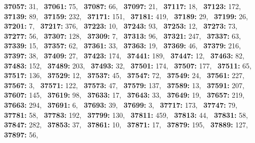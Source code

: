 \textbf{37057:} 31,\allowbreak~ 
\textbf{37061:} 75,\allowbreak~ 
\textbf{37087:} 66,\allowbreak~ 
\textbf{37097:} 21,\allowbreak~ 
\textbf{37117:} 18,\allowbreak~ 
\textbf{37123:} 172,\allowbreak~ 
\textbf{37139:} 89,\allowbreak~ 
\textbf{37159:} 232,\allowbreak~ 
\textbf{37171:} 151,\allowbreak~ 
\textbf{37181:} 419,\allowbreak~ 
\textbf{37189:} 29,\allowbreak~ 
\textbf{37199:} 26,\allowbreak~ 
\textbf{37201:} 7,\allowbreak~ 
\textbf{37217:} 376,\allowbreak~ 
\textbf{37223:} 10,\allowbreak~ 
\textbf{37243:} 93,\allowbreak~ 
\textbf{37253:} 12,\allowbreak~ 
\textbf{37273:} 73,\allowbreak~ 
\textbf{37277:} 56,\allowbreak~ 
\textbf{37307:} 128,\allowbreak~ 
\textbf{37309:} 7,\allowbreak~ 
\textbf{37313:} 96,\allowbreak~ 
\textbf{37321:} 247,\allowbreak~ 
\textbf{37337:} 63,\allowbreak~ 
\textbf{37339:} 15,\allowbreak~ 
\textbf{37357:} 62,\allowbreak~ 
\textbf{37361:} 33,\allowbreak~ 
\textbf{37363:} 19,\allowbreak~ 
\textbf{37369:} 46,\allowbreak~ 
\textbf{37379:} 216,\allowbreak~ 
\textbf{37397:} 38,\allowbreak~ 
\textbf{37409:} 27,\allowbreak~ 
\textbf{37423:} 174,\allowbreak~ 
\textbf{37441:} 189,\allowbreak~ 
\textbf{37447:} 12,\allowbreak~ 
\textbf{37463:} 82,\allowbreak~ 
\textbf{37483:} 152,\allowbreak~ 
\textbf{37489:} 203,\allowbreak~ 
\textbf{37493:} 32,\allowbreak~ 
\textbf{37501:} 174,\allowbreak~ 
\textbf{37507:} 177,\allowbreak~ 
\textbf{37511:} 65,\allowbreak~ 
\textbf{37517:} 136,\allowbreak~ 
\textbf{37529:} 12,\allowbreak~ 
\textbf{37537:} 45,\allowbreak~ 
\textbf{37547:} 72,\allowbreak~ 
\textbf{37549:} 24,\allowbreak~ 
\textbf{37561:} 227,\allowbreak~ 
\textbf{37567:} 3,\allowbreak~ 
\textbf{37571:} 122,\allowbreak~ 
\textbf{37573:} 47,\allowbreak~ 
\textbf{37579:} 137,\allowbreak~ 
\textbf{37589:} 13,\allowbreak~ 
\textbf{37591:} 207,\allowbreak~ 
\textbf{37607:} 145,\allowbreak~ 
\textbf{37619:} 98,\allowbreak~ 
\textbf{37633:} 17,\allowbreak~ 
\textbf{37643:} 33,\allowbreak~ 
\textbf{37649:} 19,\allowbreak~ 
\textbf{37657:} 219,\allowbreak~ 
\textbf{37663:} 294,\allowbreak~ 
\textbf{37691:} 6,\allowbreak~ 
\textbf{37693:} 39,\allowbreak~ 
\textbf{37699:} 3,\allowbreak~ 
\textbf{37717:} 173,\allowbreak~ 
\textbf{37747:} 79,\allowbreak~ 
\textbf{37781:} 58,\allowbreak~ 
\textbf{37783:} 192,\allowbreak~ 
\textbf{37799:} 130,\allowbreak~ 
\textbf{37811:} 459,\allowbreak~ 
\textbf{37813:} 44,\allowbreak~ 
\textbf{37831:} 58,\allowbreak~ 
\textbf{37847:} 282,\allowbreak~ 
\textbf{37853:} 37,\allowbreak~ 
\textbf{37861:} 10,\allowbreak~ 
\textbf{37871:} 17,\allowbreak~ 
\textbf{37879:} 195,\allowbreak~ 
\textbf{37889:} 127,\allowbreak~ 
\textbf{37897:} 56,\allowbreak~ 
